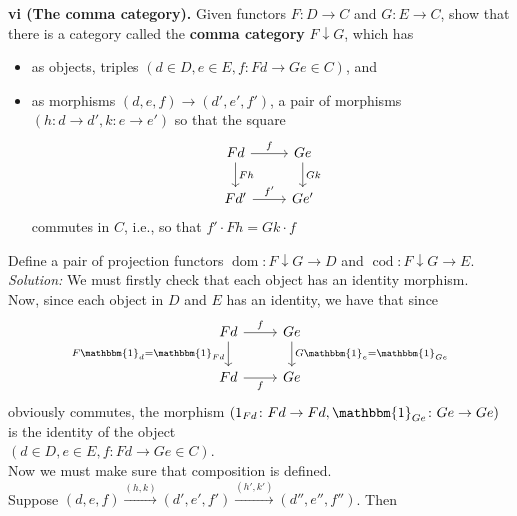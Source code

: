 \documentclass[a4paper]{article}
\theoremstyle{plain}%
\theoremstyle{definition}
\theoremstyle{remark}
\DeclareMathOperator{\dom}{dom}
\DeclareMathOperator{\cod}{cod}
\begin{document}
\textbf{vi (The comma category).} Given functors $F  \colon D \to C$ and
$G  \colon E \to C$, show that there is a category called the
\textbf{comma category} $F \downarrow G$, which has
\begin{itemize}
    \item as objects, triples $\left( d \in D, e \in E, 
        f  \colon Fd \to Ge \in C \right) $, and
    \item as morphisms $\left( d,e,f \right) 
        \to \left( d', e', f' \right) $, a pair of morphisms
        $\left( h  \colon d \to d', k  \colon e\to e' \right) $ so that the
        square
        \begin{equation*}
        \begin{tikzcd}
            Fd \ar[d, "Fh"] \ar[r, "f"] & Ge \ar[d, "Gk"]\\
            Fd' \ar[r, "f'"] & Ge'
        \end{tikzcd}
        \end{equation*}
        commutes in $C$, i.e., so that $f' \cdot  Fh = Gk \cdot  f$
\end{itemize}
Define a pair of projection functors 
$\dom  \colon F \downarrow G \to D$ and
$\cod  \colon F \downarrow G \to E$.\\
\linebreak
\textit{Solution:}
We must firstly check that each object has an identity morphism.\\
Now, since
each object in $D$ and $E$ has an identity, we have
that since
\begin{equation*}
\begin{tikzcd}
    Fd \ar[d, "F \mathbbm{1}_d = \mathbbm{1}_{Fd}"']  \ar[r, "f"] & Ge \ar[d, "G
    \mathbbm{1}_e = \mathbbm{1}_{Ge}"]\\
    Fd \ar[r, "f"'] & Ge
\end{tikzcd}
\end{equation*}
obviously commutes, the morphism
$\left( 1_{Fd}  \colon Fd \to Fd, \mathbbm{1}_{Ge}  \colon Ge \to Ge \right)
$ is the identity of the object\\
$\left( d \in D, e \in E, f  \colon Fd \to Ge \in C \right) $.\\
\linebreak
Now we must make sure that composition is defined.\\
Suppose $\left( d,e,f \right) \stackrel{\left( h,k \right) }{\to}  \left( d',e',f' \right) 
\stackrel{\left( h', k' \right) }{\to } \left( d'', e'', f'' \right) $. Then
\end{document}
